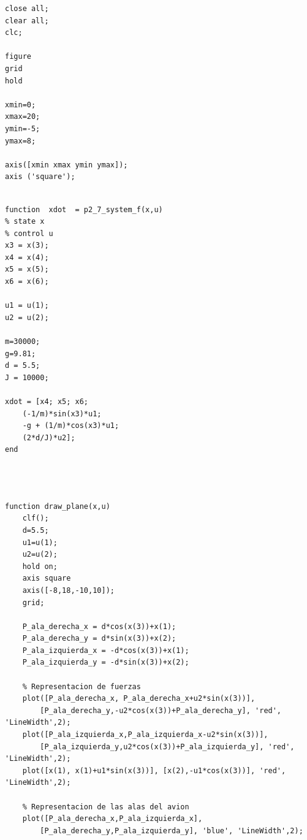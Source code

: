 \documentclass{article}
\begin{document}
\begin{itemize}
\begin{tcolorbox}
\begin{scriptsize}
\begin{verbatim}
close all; 
clear all; 
clc;

figure
grid
hold

xmin=0;
xmax=20;
ymin=-5;
ymax=8;

axis([xmin xmax ymin ymax]); 
axis ('square');

\end{verbatim}
\end{scriptsize}
\end{tcolorbox}

\begin{tcolorbox}
[
title={File \texttt{answer\_7\_f.m}}      
]
\begin{scriptsize}
\begin{verbatim}

function  xdot  = p2_7_system_f(x,u)
% state x
% control u
x3 = x(3);
x4 = x(4);
x5 = x(5);
x6 = x(6);

u1 = u(1);
u2 = u(2);

m=30000;
g=9.81;
d = 5.5;
J = 10000;

xdot = [x4; x5; x6;
    (-1/m)*sin(x3)*u1;
    -g + (1/m)*cos(x3)*u1;
    (2*d/J)*u2];
end



\end{verbatim}
\end{scriptsize}
\end{tcolorbox}

\begin{tcolorbox}
[
title={File \texttt{answer\_7\_draw.m}}      
]
\begin{scriptsize}
\begin{verbatim}

function draw_plane(x,u)
    clf();
    d=5.5;
    u1=u(1);
    u2=u(2);
    hold on;
    axis square
    axis([-8,18,-10,10]);
    grid;
    
    P_ala_derecha_x = d*cos(x(3))+x(1);
    P_ala_derecha_y = d*sin(x(3))+x(2);
    P_ala_izquierda_x = -d*cos(x(3))+x(1);
    P_ala_izquierda_y = -d*sin(x(3))+x(2);
    
    % Representacion de fuerzas
    plot([P_ala_derecha_x, P_ala_derecha_x+u2*sin(x(3))],
    	[P_ala_derecha_y,-u2*cos(x(3))+P_ala_derecha_y], 'red', 'LineWidth',2);
    plot([P_ala_izquierda_x,P_ala_izquierda_x-u2*sin(x(3))],
    	[P_ala_izquierda_y,u2*cos(x(3))+P_ala_izquierda_y], 'red', 'LineWidth',2);
    plot([x(1), x(1)+u1*sin(x(3))], [x(2),-u1*cos(x(3))], 'red', 'LineWidth',2);
    
    % Representacion de las alas del avion
    plot([P_ala_derecha_x,P_ala_izquierda_x],
    	[P_ala_derecha_y,P_ala_izquierda_y], 'blue', 'LineWidth',2);
    

\end{verbatim}
\end{scriptsize}
\end{tcolorbox}
\end{itemize}
\end{document}
